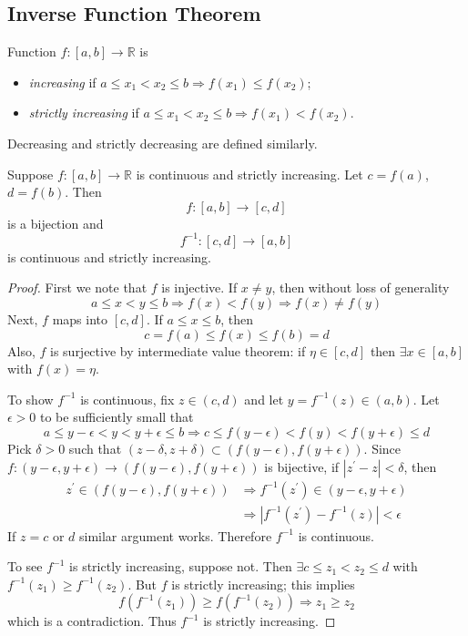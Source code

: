 \documentclass[10pt, a4paper, twoside]{report}
\begin{document}
\subsection{Inverse Function Theorem}
\begin{definition}
    Function \(f:[a,b]\to\mathbb{R}\) is 
    \begin{itemize}
        \item \emph{increasing} if \(a\leq x_1<x_2\leq b\Rightarrow f(x_1)\leq f(x_2)\);
        \item \emph{strictly increasing} if \(a\leq x_1<x_2\leq b\Rightarrow f(x_1)< f(x_2)\).
    \end{itemize}
    Decreasing and strictly decreasing are defined similarly.
    \label{def:f_increasing}
\end{definition}
\begin{theorem}
    Suppose \(f:[a,b]\to\mathbb{R}\) is continuous and strictly increasing. Let \(c=f(a)\), \(d=f(b)\). Then 
    \[f:[a,b]\to[c,d]\]
    is a bijection and
    \[f^{-1}:[c,d]\to[a,b]\]
    is continuous and strictly increasing.
    \label{thm:ift_1}
\end{theorem}
\begin{proof}
    First we note that \(f\) is injective. If \(x\neq y\), then without loss of generality
    \[a\leq x<y\leq b\Rightarrow f(x)<f(y)\Rightarrow f(x)\neq f(y)\]
    Next, \(f\) maps into \([c,d]\). If \(a\leq x\leq b\), then 
    \[c=f(a)\leq f(x)\leq f(b)=d\]
    Also, \(f\) is surjective by intermediate value theorem: if \(\eta\in[c,d]\) then \(\exists x\in[a,b]\) with \(f(x)=\eta\).

    To show \(f^{-1}\) is continuous, fix \(z\in(c,d)\) and let \(y=f^{-1}(z)\in(a,b)\). Let \(\epsilon>0\) to be sufficiently small that
    \[a\leq y-\epsilon<y<y+\epsilon\leq b\Rightarrow c\leq f(y-\epsilon)<f(y)<f(y+\epsilon)\leq d\]
    Pick \(\delta>0\) such that \((z-\delta,z+\delta)\subset(f(y-\epsilon),f(y+\epsilon))\). Since \(f:(y-\epsilon,y+\epsilon)\to(f(y-\epsilon),f(y+\epsilon))\) is bijective, if \(|z^\prime-z|<\delta\), then 
    \begin{align*}
        z^\prime\in(f(y-\epsilon),f(y+\epsilon))&\Rightarrow f^{-1}(z^\prime)\in(y-\epsilon,y+\epsilon) \\
        &\Rightarrow|f^{-1}(z^\prime)-f^{-1}(z)|<\epsilon
    \end{align*}
    If \(z=c\) or \(d\) similar argument works. Therefore \(f^{-1}\) is continuous.

    To see \(f^{-1}\) is strictly increasing, suppose not. Then \(\exists c\leq z_1<z_2\leq d\) with \(f^{-1}(z_1)\geq f^{-1}(z_2)\). But \(f\) is strictly increasing; this implies 
    \[f\left(f^{-1}(z_1)\right)\geq f\left(f^{-1}(z_2)\right)\Rightarrow z_1\geq z_2\]
    which is a contradiction. Thus \(f^{-1}\) is strictly increasing.
\end{proof}
\end{document}
